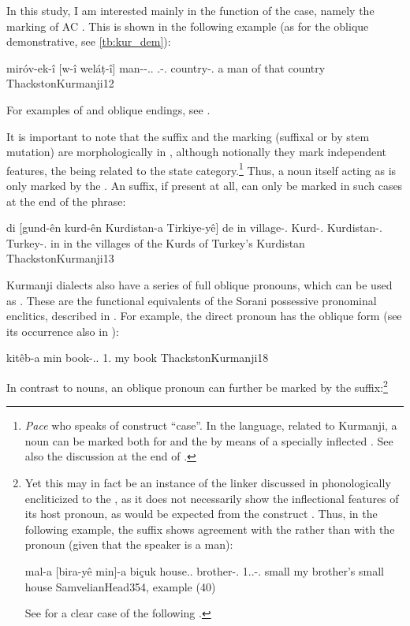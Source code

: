 \newpage 
In this study, I am interested mainly in the \gen* function of the \obl* case, namely the marking of AC \secns. This is shown in the following example (as for the oblique demonstrative, see \vref{tb:kur_dem}):

{miróv-ek-î  [w-î weláṭ-î]}
{man-\indef-\ez.\indef.\masc{} \dem.\far-\obl.\masc{} country-\obl.\masc}
{a man of that country}
{ThackstonKurmanji}{12}

For examples of \fem* and \pl* oblique endings, see .

It is important to note that the \ez* suffix and the \obl* marking (suffixal or by stem mutation) are morphologically in , although notionally they mark independent features, the \ez* being related to the state category.\footnote{\textit{Pace} \citet[7]{ThackstonKurmanji} who speaks of construct \enquote{case}. In the  language, related to Kurmanji, a noun can be marked both for  and the  by means of a specially inflected \ez* \parencites[43]{Todd}[and see further][]{LarsonYamakido}{SamvelianHead}{PlankSuffixaufnahme2012}. See also the discussion at the end of .} Thus, a \secn noun itself acting as \prim is only marked by the \ez*. An \obl* suffix, if present at all, can only be marked in such cases at the end of the \secn phrase:

{di [gund-ên kurd-ên Kurdistan-a Tirkiye-yê] de}
{in village-\ez.\pl{} Kurd-\ez.\pl{} Kurdistan-\ez.\fem{} Turkey-\obl.\fem{} in}
{in the villages of the Kurds of Turkey's Kurdistan}
{ThackstonKurmanji}{13}

Kurmanji dialects also have  a series of full oblique pronouns, which can be used as \secns. These are the functional equivalents of the Sorani possessive pronominal enclitics, described in . For example, the direct pronoun  has the oblique form  (see its occurrence also in ):

{kitêb-a min}
{book-\ez..\fem{} 1\sg.\obl}
{my book}
{ThackstonKurmanji}{18}

\newpage 
In contrast to nouns, an oblique pronoun can further be marked by the \ez* suffix:\footnote{Yet  this may in fact be an instance of the linker \ez* discussed in  phonologically encliticized to the \prim, as it does not necessarily show the inflectional features of its host pronoun, as would be expected from the construct \ez*. Thus, in the following example, the \ez* suffix  shows agreement with the \prim {} rather than with the pronoun  (given that the speaker is a man):

{mal-a [bira-yê min]-a biçuk}
{house.\ez.\fem{} brother-\ez.\masc{} 1.\sg.\obl-\ez.\fem{} small}
{my brother's small house}
{SamvelianHead}{354, example (40)}
 
See  for a clear case of the \lnk* \ez* following .
 }

